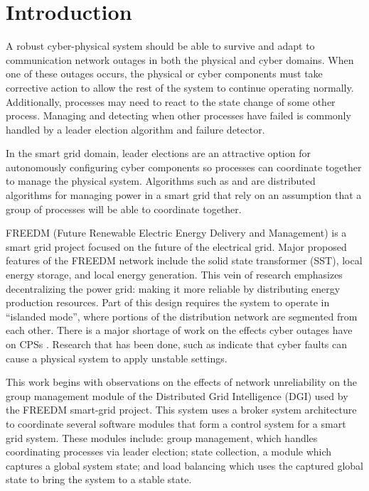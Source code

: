 \chapter{Introduction}
A robust cyber-physical system should be able to survive and adapt to communication network outages in both the physical and cyber domains.
When one of these outages occurs, the physical or cyber components must take corrective action to allow the rest of the system to continue operating normally.
Additionally, processes may need to react to the state change of some other process.
Managing and detecting when other processes have failed is commonly handled by a leader election algorithm and failure detector.

In the smart grid domain, leader elections are an attractive option for autonomously configuring cyber components so processes can coordinate together to manage the physical system.
Algorithms such as \cite{LOADBALANCING} and \cite{INCREMENTALCONSENSUS} are distributed algorithms for managing power in a smart grid that rely on an assumption that a group of processes will be able to coordinate together. 

FREEDM (Future Renewable Electric Energy Delivery and Management) is a smart grid project focused on the future of the electrical grid.
Major proposed features of the FREEDM network include the solid state transformer (SST), local energy storage, and local energy generation\cite{FREEDMMIGRATION}.
This vein of research emphasizes decentralizing the power grid: making it more reliable by distributing energy production resources.
Part of this design requires the system to operate in ``islanded mode'', where portions of the distribution network are segmented from each other.
There is a major shortage of work on the effects cyber outages have on CPSs \cite{CYBERRESEARCHCALL} \cite{SMARTGRIDBENEFITS}.
Research that has been done, such as \cite{HARINI} indicate that cyber faults can cause a physical system to apply unstable settings.

This work begins with observations on the effects of network unreliability on the group management module of the Distributed Grid Intelligence (DGI) used by the FREEDM smart-grid project.
This system uses a broker system architecture to coordinate several software modules that form a control system for a smart grid system.
These modules include: group management, which handles coordinating processes via leader election; state collection, a module which captures a global system state; and load balancing which uses the captured global state to bring the system to a stable state.

